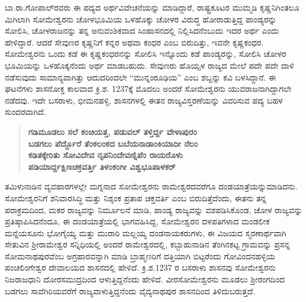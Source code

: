 ಬಾ.ರಾ.ಗೋಪಾಲ್​ರವರು ಈ ಪದ್ಯದ ಅರ್ಥವಿವೇಚನೆಯನ್ನು ಮಾಡಿದ್ದಾರೆ, ರಾಷ್ಟ್ರಕೂಟರ ಮುಮ್ಮಡಿ ಕೃಷ್ಣನಿಗಿಂತಲೂ ಮಿಗಿಲಾಗಿ ಸೋಮೇಶ್ವರನು ಚೋಳಭೂಮಿಯ ಒಳಹೊಕ್ಕು ಚೋಳರ ವಿರುದ್ಧ ಹೋರಾಡುತ್ತಿದ್ದ ಪಾಂಡ್ಯರನ್ನು ಸೋಲಿಸಿ, ಚೋಳರಾಜನನ್ನು ತನ್ನ ಅನುವಂಶಿಕವಾದ ಸಿಂಹಾಸನದಲ್ಲಿ ನಿಲ್ಲಿಸಿದನೆಂಬುದು ಇದರ ಅರ್ಥ ಎಂದು ಹೇಳಿದ್ದಾರೆ. ಆದರೆ ಸೇವುಣರ ಕೃಷ್ಣನಿಗೆ ಕನ್ನರ ಅಥವಾ ಕಂಧರ ಎಂಬ ಬಿರುದಿತ್ತು, ಇವನೇ ಕೃಷ್ಣಕಂಧರ. ಸೋಮೇಶ್ವರನು ಒಂದು ಕಡೆ ಈ ಕೃಷ್ಣಕಂಧರನನ್ನು ಸೋಲಿಸಿ ಇನ್ನೊಂದು ಕಡೆ ಪಾಂಡ್ಯರನ್ನು, ಸೋಲಿಸಿ ಚೋಳರ ಭೂಮಿಯನ್ನು ಒಳಹೊಕ್ಕನೆಂದು ಅರ್ಥ ಮಾಡಬಹುದು. ಸೇವುಣರು ಹೊಯ್ಸಳ ರಾಜ್ಯದ ಮೇಲೆ ಪದೇ ಪದೇ ದಾಳಿ ನಡೆಸುವುದು ಸಾಮಾನ್ಯವಾಗಿತ್ತು ಆದುದರಿಂದಲೇ “ಮುನ್ನಂರೂಢಿಯ” ಎಂಬ ಶಬ್ದನ್ನು ಕವಿ ಬಳಸಿದ್ದಾನೆ. ಈ ಘಟನೆಗಳು ಶಾಸನೋಕ್ತ ಕಾಲವಾದ ಕ್ರಿ.ಶ. 1237ಕ್ಕೆ ಮೊದಲು ಅಂದರೆ ಸೋಮೇಶ್ವರನು ಯುವರಾಜನಾಗಿದ್ದಾಗಲೇ ನಡೆದವು. ಇದೇ ಬಸರಾಳು, ಭೀಮನಹಳ್ಳಿ, ಶಾಸನಗಳಲ್ಲಿ ಈತನ ರಾಜ್ಯವಿಸ್ತರಣೆಯನ್ನು ವಿವರಿಸುವ ಪದ್ಯ ಬಹಳ ಸುಂದರವಾಗಿದೆ.

\begin{verse}
\textbf{ಗಡಿಮೂಡಲು ಸಲೆ ಕಂಚಿಯತ್ತ, ಪಡುವಲ್​ ತಳ್ತಿರ್ದ್ದ ವೇಳಾಪುರಂ} \\\textbf{ಬಡಗಲು ಪೆರ್ದ್ದೊರೆ ತೆಂಕಲಂಕದ ಬಬೆಯನಾಡಾಂಕಿಯಾದೀ ನೆಲಂ} \\\textbf{ಕಡಿತಕ್ಕೇರಿತು ಸೋವಿದೇವ ನೃಪನಿಂದೇವಣ್ನಿಪೆಂ ರಾಯರೊಳು} \\\textbf{ಪಡಿಯಾರ್ದ್ದಕ್ಷಿಣಚಕ್ರವರ್ತ್ತಿ ತಿಳಂಕಂಗೀ ವಿಶ್ವಭೂಪಾಳಕರ್​}
\end{verse}

ತಮಿಳುನಾಡಿನ ವ್ಯವಹಾರಗಳಲ್ಲೇ ಮಗ್ನನಾದ ಸೋಮೇಶ್ವರನು ರಾಮೇಶ್ವರದವರೆಗೂ ದಂಡಯಾತ್ರೆಯನ್ನು\break ಮಾಡಿದನು. ಸೋಮೇಶ್ವರನಿಗೆ ಶನಿವಾರಸಿದ್ಧಿ ಮತ್ತು ನಿಶ್ಶಂಕ ಪ್ರತಾಪ ಚಕ್ತವರ್ತಿ ಎಂಬ ಬಿರುದಿತ್ತೆದೆಂದು, ಈತನು ತನ್ನ ಪರಾಕ್ರಮದಿಂದ, ಮಕರ ರಾಜ್ಯವನ್ನು ನಿರ್ಮೂಲನೆ ಮಾಡಿ, ಪಾಂಡ್ಯ ರಾಜ್ಯವನ್ನು ವಶಪಡಿಸಿಕೊಂಡ, ಚೋಳ ರಾಜ್ಯವನ್ನು ಪ್ರತಿಷ್ಠಾಪಿಸಿದನೆಂದೂ, ಈ ದಂಡಯಾತ್ರೆಯಲ್ಲಿ ಭಾಗವಹಿಸಿದ್ದ, ಸೋಮೇಶ್ವರನ ದಳಪತಿಗಳಾದ ಮಂಡಲೀಕ ಮನ್ನೆಯಸೂನು ಭೋಗೈಯ್ಯ ಮತ್ತು ಮುರಾರಿ ಮಲ್ಲಯ್ಯ ದಂಡನಾಯಕರುಗಳು, ಈ ವಿಜಯದ ಸ್ಮರಣಾರ್ಥವಾಗಿ ಸೇತುವಿನ ಶ‍್ರೀರಾಮೇಶ್ವರ ಸನ್ನಿಧಿಯಲ್ಲಿ ಅಂದರೆ ರಾಮೇಶ್ವರದಲ್ಲಿ, ಕಬ್ಬಾಹುನಾಡಿನ ತೆಂಗಿನಕಟ್ಟ ಗ್ರಾಮವನ್ನು ಪ್ರಸನ್ನ ಸೋಮನಾಥಪುರವೆಂಬ ಅಗ್ರಹಾರವನ್ನಾಗಿ ಮಾಡಿ ಬ್ರಾಹ್ಮಣರಿಗೆ ದತ್ತಿಯಾಗಿ ಬಿಟ್ಟರೆಂದು ಗೋವಿಂದನಹಳ್ಳಿಯ ಪಂಚಲಿಂಗೇಶ್ವರ ದೇವಾಲಯದ ಶಾಸನದಲ್ಲಿ ಹೇಳಿದೆ. ಕ್ರಿ.ಶ.1237 ರ ಬಸರಾಳು ಶಾಸನವು ಸೋಮೇಶ್ವರನು ನಿಜರಾಜಧಾನಿ ದೋರಸಮುದ್ರ\-ದಿಂದ ಆಳುತ್ತಿದ್ದನೆಂದು ಹೇಳಿದೆ. ವೀರಸೋಮೇಶ್ವರನು ಮೂಡಲು ಶ‍್ರೀರಂಗದಿಂದ ಬಡಗಲು ಸಾವೆಗಿರಿಯವರೆಗೆ ರಾಜ್ಯವಾಳುತ್ತಿದ್ದನೆಂದು ವೈದ್ಯನಾಥಪುರ ಶಾಸನದಿಂದ ತಿಳಿದುಬರುತ್ತದೆ.

